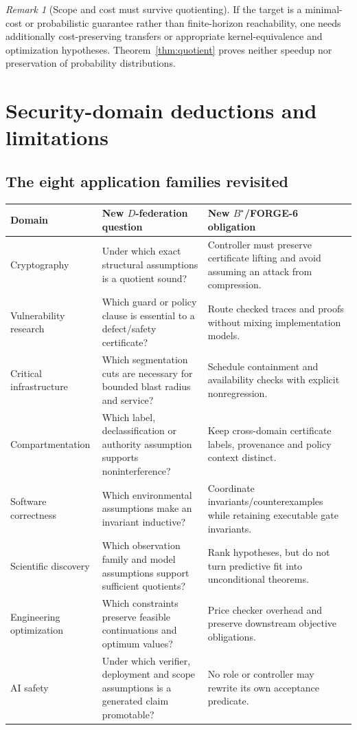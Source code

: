 \documentclass[11pt,letterpaper,oneside]{book}
\theoremstyle{definition}
\theoremstyle{remark}
\newtheorem{remark}[theorem]{Remark}
\begin{document}
\begin{remark}[Scope and cost must survive quotienting]
If the target is a minimal-cost or probabilistic guarantee rather
than finite-horizon reachability, one needs additionally cost-preserving
transfers or appropriate kernel-equivalence and optimization
hypotheses. Theorem~\ref{thm:quotient} proves neither speedup nor
preservation of probability distributions.\end{remark}

\chapter{Security-domain deductions and limitations}
\section{The eight application families revisited}
\small
\begin{longtable}{>{\raggedright\arraybackslash}p{}>{\raggedright\arraybackslash}p{}>{\raggedright\arraybackslash}p{}}
\toprule
Domain & New $D$-federation question & New $B^\star$/FORGE-6 obligation \\\midrule
\endhead
Cryptography & Under which exact structural assumptions is a quotient sound? & Controller must preserve certificate lifting and avoid assuming an attack from compression.\\
Vulnerability research & Which guard or policy clause is essential to a defect/safety certificate? & Route checked traces and proofs without mixing implementation models.\\
Critical infrastructure & Which segmentation cuts are necessary for bounded blast radius and service? & Schedule containment and availability checks with explicit nonregression.\\
Compartmentation & Which label, declassification or authority assumption supports noninterference? & Keep cross-domain certificate labels, provenance and policy context distinct.\\
Software correctness & Which environmental assumptions make an invariant inductive? & Coordinate invariants/counterexamples while retaining executable gate invariants.\\
Scientific discovery & Which observation family and model assumptions support sufficient quotients? & Rank hypotheses, but do not turn predictive fit into unconditional theorems.\\
Engineering optimization & Which constraints preserve feasible continuations and optimum values? & Price checker overhead and preserve downstream objective obligations.\\
AI safety & Under which verifier, deployment and scope assumptions is a generated claim promotable? & No role or controller may rewrite its own acceptance predicate.\\
\bottomrule
\end{longtable}
\normalsize
\end{document}
